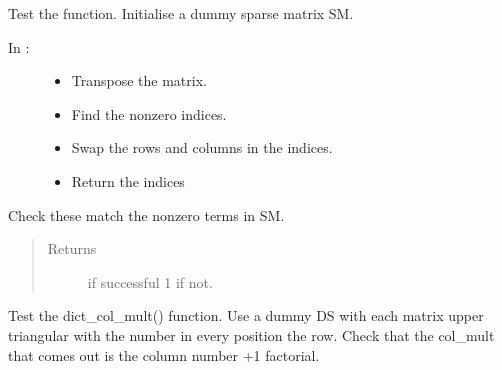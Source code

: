 \documentclass[letterpaper,10pt,english]{sphinxmanual}
\begin{document}
\begin{fulllineitems}
\label{\detokenize{index:DictionarySparseMatrix.test_19}}
Test the  function.
Initialise a dummy sparse matrix SM.
\begin{description}
\item[{In :}] \leavevmode\begin{itemize}
\item {} 
Transpose the matrix.

\item {} 
Find the nonzero indices.

\item {} 
Swap the rows and columns in the indices.

\item {} 
Return the indices

\end{itemize}

\end{description}

Check these match the nonzero terms in SM.
\begin{quote}\begin{description}
\item[{Returns}]  if successful 1 if not.

\end{description}\end{quote}

\end{fulllineitems}


\begin{fulllineitems}
\label{\detokenize{index:DictionarySparseMatrix.test_20}}
Test the dict\_col\_mult() function.
Use a dummy DS with each matrix upper triangular with the number in   every position the row.
Check that the col\_mult that comes out is the column number +1   factorial.

\end{fulllineitems}

\end{document}
